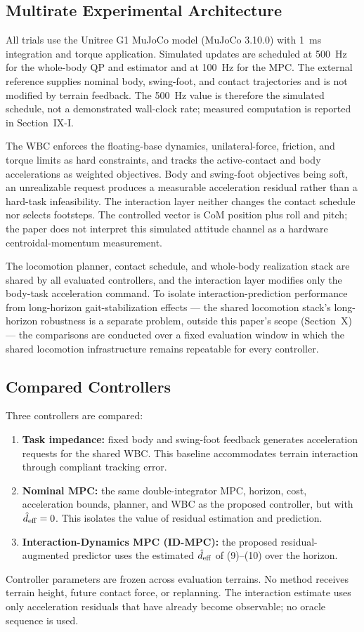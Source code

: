 \documentclass[journal]{IEEEtran}
\theoremstyle{plain}
\theoremstyle{definition}
\theoremstyle{remark}
\newcommand{\deff}{d_{\rm eff}}
\begin{document}
\subsection{Multirate Experimental Architecture}

All trials use the Unitree G1 MuJoCo model (MuJoCo 3.10.0) with 1~ms integration and torque application. Simulated updates are scheduled at 500~Hz for the whole-body QP and estimator and at 100~Hz for the MPC. The external reference supplies nominal body, swing-foot, and contact trajectories and is not modified by terrain feedback. The 500~Hz value is therefore the simulated schedule, not a demonstrated wall-clock rate; measured computation is reported in Section~IX-I.

The WBC enforces the floating-base dynamics, unilateral-force, friction, and torque limits as hard constraints, and tracks the active-contact and body accelerations as weighted objectives. Body and swing-foot objectives being soft, an unrealizable request produces a measurable acceleration residual rather than a hard-task infeasibility. The interaction layer neither changes the contact schedule nor selects footsteps. The controlled vector is CoM position plus roll and pitch; the paper does not interpret this simulated attitude channel as a hardware centroidal-momentum measurement.

The locomotion planner, contact schedule, and whole-body realization stack are shared by all evaluated controllers, and the interaction layer modifies only the body-task acceleration command. To isolate interaction-prediction performance from long-horizon gait-stabilization effects --- the shared locomotion stack's long-horizon robustness is a separate problem, outside this paper's scope (Section~X) --- the comparisons are conducted over a fixed evaluation window in which the shared locomotion infrastructure remains repeatable for every controller.

\subsection{Compared Controllers}

Three controllers are compared:
\begin{enumerate}
\item \textbf{Task impedance:} fixed body and swing-foot feedback generates acceleration requests for the shared WBC. This baseline accommodates terrain interaction through compliant tracking error.
\item \textbf{Nominal MPC:} the same double-integrator MPC, horizon, cost, acceleration bounds, planner, and WBC as the proposed controller, but with $\hat \deff=0$. This isolates the value of residual estimation and prediction.
\item \textbf{Interaction-Dynamics MPC (ID-MPC):} the proposed residual-augmented predictor uses the estimated $\hat \deff$ of (9)--(10) over the horizon.
\end{enumerate}
Controller parameters are frozen across evaluation terrains. No method receives terrain height, future contact force, or replanning. The interaction estimate uses only acceleration residuals that have already become observable; no oracle sequence is used.
\end{document}
